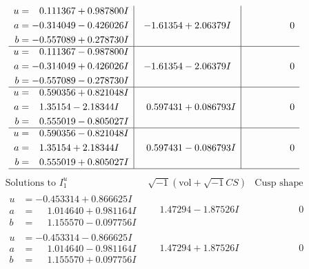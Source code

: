 \documentclass[1p]{elsarticle_modified}
\theoremstyle{definition}
\newcommand{\I}{\sqrt{-1}}
\begin{document}
$$\begin{array}{c|c|c}
\begin{aligned}
u &= \phantom{-}0.111367 + 0.987800 I \\
a &= -0.314049 - 0.426026 I \\
b &= -0.557089 + 0.278730 I\end{aligned}
 & -1.61354 + 2.06379 I & \phantom{-0.000000 } 0 \\ \hline\begin{aligned}
u &= \phantom{-}0.111367 - 0.987800 I \\
a &= -0.314049 + 0.426026 I \\
b &= -0.557089 - 0.278730 I\end{aligned}
 & -1.61354 - 2.06379 I & \phantom{-0.000000 } 0 \\ \hline\begin{aligned}
u &= \phantom{-}0.590356 + 0.821048 I \\
a &= \phantom{-}1.35154 - 2.18344 I \\
b &= \phantom{-}0.555019 - 0.805027 I\end{aligned}
 & \phantom{-}0.597431 + 0.086793 I & \phantom{-0.000000 } 0 \\ \hline\begin{aligned}
u &= \phantom{-}0.590356 - 0.821048 I \\
a &= \phantom{-}1.35154 + 2.18344 I \\
b &= \phantom{-}0.555019 + 0.805027 I\end{aligned}
 & \phantom{-}0.597431 - 0.086793 I & \phantom{-0.000000 } 0\\
 \hline 
 \end{array}$$\newpage$$\begin{array}{c|c|c}  
\text{Solutions to }I^u_{1}& \I (\text{vol} + \sqrt{-1}CS) & \text{Cusp shape}\\
 \hline 
\begin{aligned}
u &= -0.453314 + 0.866625 I \\
a &= \phantom{-}1.014640 + 0.981164 I \\
b &= \phantom{-}1.155570 - 0.097756 I\end{aligned}
 & \phantom{-}1.47294 - 1.87526 I & \phantom{-0.000000 } 0 \\ \hline\begin{aligned}
u &= -0.453314 - 0.866625 I \\
a &= \phantom{-}1.014640 - 0.981164 I \\
b &= \phantom{-}1.155570 + 0.097756 I\end{aligned}
 & \phantom{-}1.47294 + 1.87526 I & \phantom{-0.000000 } 0 \\ \hline\begin{aligned}

\end{aligned}
\end{array}$$
\end{document}
